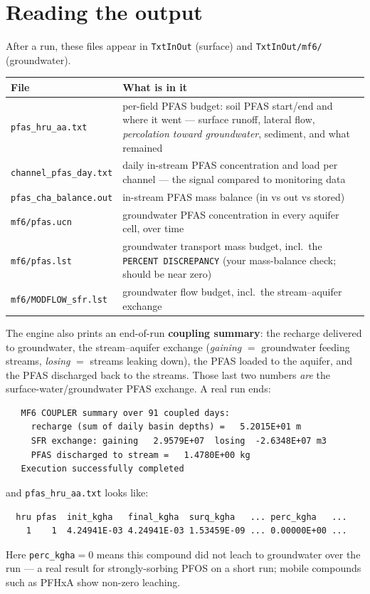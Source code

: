 \documentclass[12pt]{article}
\begin{document}
\section{Reading the output}\label{g:out}
After a run, these files appear in \texttt{TxtInOut} (surface) and
\texttt{TxtInOut/mf6/} (groundwater).
\begin{table}[ht]\centering\small
\begin{tabularx}{\textwidth}{lX}
\toprule
File & What is in it \\ \midrule
\texttt{pfas\_hru\_aa.txt} & per-field PFAS budget: soil PFAS start/end and where it went --- surface runoff, lateral flow, \emph{percolation toward groundwater}, sediment, and what remained \\
\texttt{channel\_pfas\_day.txt} & daily in-stream PFAS concentration and load per channel --- the signal compared to monitoring data \\
\texttt{pfas\_cha\_balance.out} & in-stream PFAS mass balance (in vs out vs stored) \\
\texttt{mf6/pfas.ucn} & groundwater PFAS concentration in every aquifer cell, over time \\
\texttt{mf6/pfas.lst} & groundwater transport mass budget, incl.\ the \texttt{PERCENT DISCREPANCY} (your mass-balance check; should be near zero) \\
\texttt{mf6/MODFLOW\_sfr.lst} & groundwater flow budget, incl.\ the stream--aquifer exchange \\
\bottomrule
\end{tabularx}
\end{table}

\noindent The engine also prints an end-of-run \textbf{coupling summary}: the
recharge delivered to groundwater, the stream--aquifer exchange (\emph{gaining} $=$
groundwater feeding streams, \emph{losing} $=$ streams leaking down), the PFAS
loaded to the aquifer, and the PFAS discharged back to the streams. Those last two
numbers \emph{are} the surface-water/groundwater PFAS exchange. A real run ends:
\begin{verbatim}
   MF6 COUPLER summary over 91 coupled days:
     recharge (sum of daily basin depths) =   5.2015E+01 m
     SFR exchange: gaining   2.9579E+07  losing  -2.6348E+07 m3
     PFAS discharged to stream =   1.4780E+00 kg
   Execution successfully completed
\end{verbatim}
and \texttt{pfas\_hru\_aa.txt} looks like:
\begin{verbatim}
  hru pfas  init_kgha   final_kgha  surq_kgha   ... perc_kgha   ...
    1    1  4.24941E-03 4.24941E-03 1.53459E-09 ... 0.00000E+00 ...
\end{verbatim}
Here \texttt{perc\_kgha}$=0$ means this compound did not leach to groundwater over
the run --- a real result for strongly-sorbing PFOS on a short run; mobile
compounds such as PFHxA show non-zero leaching.
\end{document}
